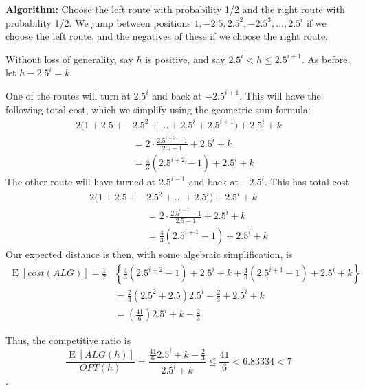 \documentclass{article}
\newcommand{\E}[1]{\operatorname{E}\left[#1\right]}
\begin{document}
\begin{enumerate}
      \textbf{Algorithm: } Choose the left route with probability 1/2 and the right route with probability 1/2. We jump between positions
      $1,-2.5,{2.5^2},- 2.5^3 ,\ldots , 2.5^i $ if we choose the left route, and the negatives
      of these if we choose the right route. 

      Without loss of generality, say $h$ is positive, and say $2.5^i < h \leq 2.5^{i+1}$. As before, let
      $h - 2.5^i = k$.

      One of the routes will turn at $2.5^i$ and back at $-2.5^{i+1}$. 
      This will have the following total cost, which we simplify using the geometric sum formula:
      \begin{align*}
      2 (1 + 2.5 + &2.5^2 + ... + 2.5^i + 2.5^{i+1})  + 2.5^i + k\\
      & = 2 \cdot\frac{2.5^{i+2} -1}{2.5-1} + 2.5^i + k \\& = \frac{4}{3} (2.5^{i+2} - 1) + 2.5^i + k
\end{align*}
      The other route will have turned at $2.5^{i-1}$ and back at $-2.5^i$. This has total cost
          \begin{align*}
      2 (1 + 2.5 + &2.5^2 + ... + 2.5^i)  + 2.5^i + k\\
      & = 2 \cdot\frac{2.5^{i+1} -1}{2.5-1} + 2.5^i + k \\& = \frac{4}{3} (2.5^{i+1} - 1) + 2.5^i + k
\end{align*}        
       Our expected distance is then, with some algebraic simplification, is
      \begin{align*}
      \E{cost(ALG)} =  \frac12&\left\{ \frac{4}{3} (2.5^{i+2} - 1) + 2.5^i + k + \frac{4}{3} (2.5^{i+1} - 1) + 2.5^i + k \right\} \\
      &= \frac23(2.5^2 + 2.5) 2.5^i  - \frac23 + 2.5^i +k\\
       &= \left(\frac{41}{6}\right) 2.5^i + k - \frac23
       \end{align*}
      
      Thus, the competitive ratio is $$\frac{\E{ALG(h)}}{OPT(h)} = \frac{\frac{41}{6}2.5^i + k - \frac23}{2.5^i + k}
    \leq \frac{41}{6} < 6.83334 < 7$$.
  \end{enumerate}
\end{document}
